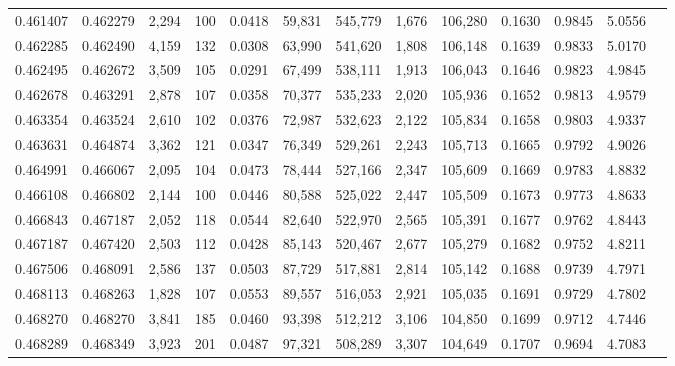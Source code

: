 \begin{tabular}{rrrrrrrrrrrrr}
0.461407 & 0.462279 & 2,294 &   100 &                                     0.0418 &  59,831 & 545,779 &   1,676 & 106,280 & 0.1630 & 0.9845 & 5.0556 \\
0.462285 & 0.462490 & 4,159 &   132 &                                     0.0308 &  63,990 & 541,620 &   1,808 & 106,148 & 0.1639 & 0.9833 & 5.0170 \\
0.462495 & 0.462672 & 3,509 &   105 &                                     0.0291 &  67,499 & 538,111 &   1,913 & 106,043 & 0.1646 & 0.9823 & 4.9845 \\
0.462678 & 0.463291 & 2,878 &   107 &                                     0.0358 &  70,377 & 535,233 &   2,020 & 105,936 & 0.1652 & 0.9813 & 4.9579 \\
0.463354 & 0.463524 & 2,610 &   102 &                                     0.0376 &  72,987 & 532,623 &   2,122 & 105,834 & 0.1658 & 0.9803 & 4.9337 \\
0.463631 & 0.464874 & 3,362 &   121 &                                     0.0347 &  76,349 & 529,261 &   2,243 & 105,713 & 0.1665 & 0.9792 & 4.9026 \\
0.464991 & 0.466067 & 2,095 &   104 &                                     0.0473 &  78,444 & 527,166 &   2,347 & 105,609 & 0.1669 & 0.9783 & 4.8832 \\
0.466108 & 0.466802 & 2,144 &   100 &                                     0.0446 &  80,588 & 525,022 &   2,447 & 105,509 & 0.1673 & 0.9773 & 4.8633 \\
0.466843 & 0.467187 & 2,052 &   118 &                                     0.0544 &  82,640 & 522,970 &   2,565 & 105,391 & 0.1677 & 0.9762 & 4.8443 \\
0.467187 & 0.467420 & 2,503 &   112 &                                     0.0428 &  85,143 & 520,467 &   2,677 & 105,279 & 0.1682 & 0.9752 & 4.8211 \\
0.467506 & 0.468091 & 2,586 &   137 &                                     0.0503 &  87,729 & 517,881 &   2,814 & 105,142 & 0.1688 & 0.9739 & 4.7971 \\
0.468113 & 0.468263 & 1,828 &   107 &                                     0.0553 &  89,557 & 516,053 &   2,921 & 105,035 & 0.1691 & 0.9729 & 4.7802 \\
0.468270 & 0.468270 & 3,841 &   185 &                                     0.0460 &  93,398 & 512,212 &   3,106 & 104,850 & 0.1699 & 0.9712 & 4.7446 \\
0.468289 & 0.468349 & 3,923 &   201 &                                     0.0487 &  97,321 & 508,289 &   3,307 & 104,649 & 0.1707 & 0.9694 & 4.7083 \\

\end{tabular}

